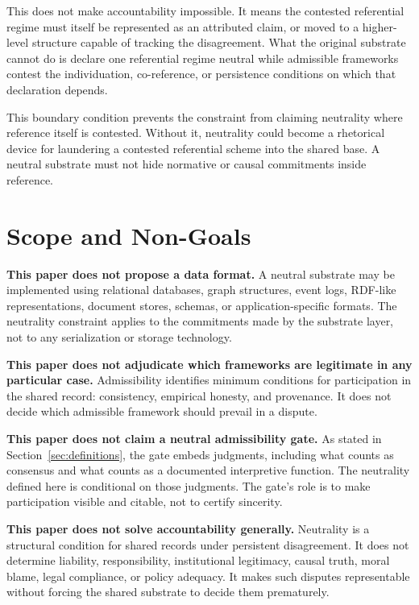 \documentclass[11pt]{article}
\theoremstyle{plain}
\theoremstyle{definition}
\theoremstyle{remark}
\newcommand{\SecRef}[1]{Section~\ref{#1}}
\begin{document}
This does not make accountability impossible.
It means the contested
referential regime must itself be represented as an attributed claim, or moved
to a higher-level structure capable of tracking the disagreement.
What the original substrate cannot do is declare one referential regime neutral while
admissible frameworks contest the individuation, co-reference, or persistence
conditions on which that declaration depends.

This boundary condition prevents the constraint from claiming neutrality
where reference itself is contested.
Without it, neutrality could become a rhetorical device for laundering a contested
referential scheme into the shared base.
A neutral substrate must not hide normative or causal commitments inside reference.

\section{Scope and Non-Goals}
\label{sec:non-goals}

\textbf{This paper does not propose a data format.} A neutral substrate may be
implemented using relational databases, graph structures, event logs, RDF-like
representations, document stores, schemas, or application-specific formats.
The neutrality constraint applies to the commitments made by the substrate layer,
not to any serialization or storage technology.

\textbf{This paper does not adjudicate which frameworks are legitimate in any
  particular case.} Admissibility identifies minimum conditions for participation
in the shared record: consistency, empirical honesty, and provenance.
It does not decide which admissible framework should prevail in a dispute.

\textbf{This paper does not claim a neutral admissibility gate.} As stated in
\SecRef{sec:definitions}, the gate embeds judgments, including what counts as
consensus and what counts as a documented interpretive function.
The neutrality defined here is conditional on those judgments.
The gate's role is to make participation visible and citable, not to certify sincerity.

\textbf{This paper does not solve accountability generally.} Neutrality is a
structural condition for shared records under persistent disagreement.
It does not determine liability, responsibility, institutional legitimacy, causal
truth, moral blame, legal compliance, or policy adequacy.
It makes such disputes representable without forcing the shared substrate to decide them
prematurely.
\end{document}
